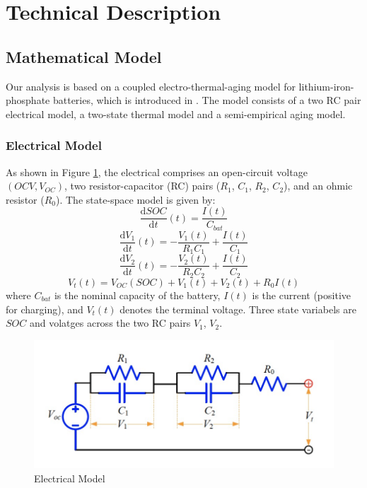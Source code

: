 \documentclass[10pt]{article}
\begin{document}
\section{Technical Description}
\subsection{Mathematical Model}
Our analysis is based on a coupled electro-thermal-aging model for lithium-iron-phosphate batteries, which is introduced in \cite{ref:1}. 
The model consists of a two RC pair electrical model, a two-state thermal model and a semi-empirical aging model.
\subsubsection{Electrical Model}
As shown in Figure \ref{p1}, the electrical comprises an open-circuit voltage $(OCV, V_{OC})$, two resistor-capacitor (RC) pairs ($R_1$, $C_1$, $R_2$, $C_2$), and an ohmic resistor ($R_0$). The state-space model is given by:
\begin{equation}
	\frac{\mathrm{d} SOC}{\mathrm{d}t}(t) = \frac{I(t)}{C_{bat}}
\end{equation}
\begin{equation}
\frac{\mathrm{d} V_1}{\mathrm{d}t}(t) = -\frac{V_1(t)}{R_1C_1}+\frac{I(t)}{C_1}
\end{equation}
\begin{equation}
\frac{\mathrm{d} V_2}{\mathrm{d}t}(t) = -\frac{V_2(t)}{R_2C_2}+\frac{I(t)}{C_2}
\end{equation}
\begin{equation}
V_t(t) = V_{OC}(SOC)+V_1(t)+V_2(t)+R_0I(t)
\end{equation}
where $C_{bat}$ is the nominal capacity of the battery, $I(t)$ is the current (positive for charging), and $V_t(t)$ denotes the terminal voltage. Three state variabels are $SOC$ and volatges across the two RC pairs $V_1$, $V_2$. 
\begin{figure}[H]
	\centering
	\includegraphics[height=0.3\textwidth]{circuit.jpg}
	\caption{Electrical Model}
	\label{p1}
\end{figure}
\end{document}
